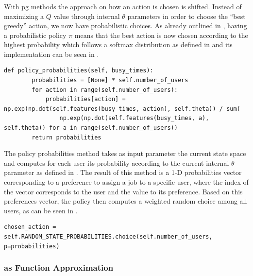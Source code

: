 \subsubsection{}

With \gls{pg} methods the approach on how an action is chosen is shifted. Instead of maximizing a $Q$ value through internal $\theta$ parameters in order to choose the ``best greedy'' action, we now have probabilistic choices. As already outlined in , having a probabilistic policy $\pi$ means that the best action is now chosen according to the highest probability which follows a softmax distribution as defined in  and its implementation can be seen in .

\begin{lstlisting}[caption=Softmax distribution of preferences probabilities,label=lst:softmax_probabilities,style=CustomPython]
    def policy_probabilities(self, busy_times):
        probabilities = [None] * self.number_of_users
        for action in range(self.number_of_users):
            probabilities[action] = np.exp(np.dot(self.features(busy_times, action), self.theta)) / sum(
                np.exp(np.dot(self.features(busy_times, a), self.theta)) for a in range(self.number_of_users))
        return probabilities
\end{lstlisting}

The policy probabilities method takes as input parameter the current state space and computes for each user its probability according to the current internal $\theta$ parameter as defined in . The result of this method is a 1-D probabilities vector corresponding to a preference to assign a job to a specific user, where the index of the vector corresponds to the user and the value to its preference. Based on this preferences vector, the policy then computes a weighted random choice among all users, as can be seen in .

\begin{lstlisting}[caption=Probabilistic user choice,label=lst:prob_user_choice,style=CustomPython]
	chosen_action = self.RANDOM_STATE_PROBABILITIES.choice(self.number_of_users, p=probabilities)
\end{lstlisting}

\subsubsection{ as Function Approximation}

